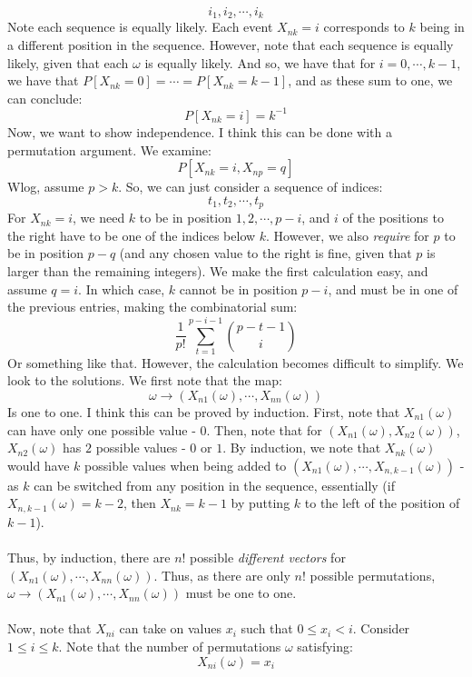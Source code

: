 \documentclass[12pt,a4paper]{article}
\newcommand{\1}[1]{\mathbbm{1}\left\{ #1 \right\}}
\begin{document}
$$
	i_1, i_2, \cdots, i_k
$$
Note each sequence is equally likely. Each event $X_{nk} = i$ corresponds to $k$ being in a different position in the sequence. However, note that each sequence is equally likely, given that each $\omega$ is equally likely. And so, we have that for $i = 0, \cdots, k - 1$, we have that $P[X_{nk} = 0] = \cdots = P[X_{nk} = k - 1]$, and as these sum to one, we can conclude:
$$
	P[X_{nk} = i] = k^{-1}
$$
Now, we want to show independence. I think this can be done with a permutation argument. We examine:
$$
	P\left[X_{nk} = i, X_{np} = q\right]
$$
Wlog, assume $p > k$. So, we can just consider a sequence of indices:
$$
	t_1, t_2, \cdots, t_p
$$
For $X_{nk} = i$, we need $k$ to be in position $1, 2, \cdots, p - i$, and $i$ of the positions to the right have to be one of the indices below $k$. However, we also \textit{require} for $p$ to be in position $p - q$ (and any chosen value to the right is fine, given that $p$ is larger than the remaining integers). We make the first calculation easy, and assume $q = i$. In which case, $k$ cannot be in position $p - i$, and must be in one of the previous entries, making the combinatorial sum:
$$
	\frac{1}{p!}\sum_{t=1}^{p - i - 1} {p - t - 1 \choose i}
$$
Or something like that. However, the calculation becomes difficult to simplify. We look to the solutions. We first note that the map:
$$
	\omega \to (X_{n1}(\omega), \cdots, X_{nn}(\omega))
$$
Is one to one. I think this can be proved by induction. First, note that $X_{n1}(\omega)$ can have only one possible value - $0$. Then, note that for $(X_{n1}(\omega), X_{n2}(\omega))$, $X_{n2}(\omega)$ has $2$ possible values - $0$ or $1$. By induction, we note that $X_{nk}(\omega)$ would have $k$ possible values when being added to $(X_{n1}(\omega), \cdots, X_{n,k-1}(\omega))$ - as $k$ can be switched from any position in the sequence, essentially (if $X_{n,k-1}(\omega) = k - 2$, then $X_{nk} = k - 1$ by putting $k$ to the left of the position of $k - 1$).
\\\\
Thus, by induction, there are $n!$ possible \textit{different vectors} for $(X_{n1}(\omega), \cdots, X_{nn}(\omega))$. Thus, as there are only $n!$ possible permutations, $\omega \to (X_{n1}(\omega), \cdots, X_{nn}(\omega))$ must be one to one.
\\\\
Now, note that $X_{ni}$ can take on values $x_i$ such that $0 \leq x_i < i$. Consider $1 \leq i \leq k$. Note that the number of permutations $\omega$ satisfying:
$$
	X_{ni}(\omega) = x_i
$$
\end{document}
